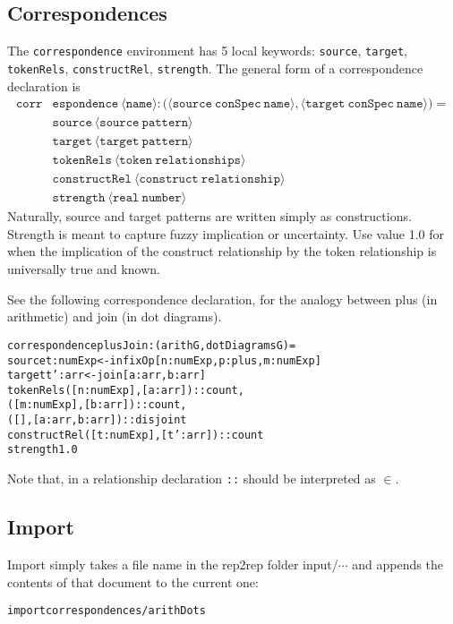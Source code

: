 \documentclass[a4paper]{article}
\theoremstyle{definition}
\begin{document}
	\subsection{Correspondences}
	The \texttt{correspondence} environment has 5 local keywords: \texttt{source}, \texttt{target}, \texttt{tokenRels}, \texttt{constructRel}, \texttt{strength}. The general form of a correspondence declaration is \begin{align*}
	\mathtt{corr}& \mathtt{espondence}\ \mathtt{\langle name\rangle : \big(\langle source\ conSpec\ name\rangle,\langle target\ conSpec\ name\rangle\big)} =\\[-3pt]
	& \mathtt{source\ \langle source\ pattern \rangle}\\[-3pt]
	& \mathtt{target\  \langle target\ pattern \rangle}\\[-3pt]
	& \mathtt{tokenRels\  \langle token\ relationships \rangle}\\[-3pt]
	& \mathtt{constructRel\  \langle construct\ relationship \rangle}\\[-3pt]
	& \mathtt{strength\  \langle real\ number \rangle}
	\end{align*}
	Naturally, source and target patterns are written simply as constructions. Strength is meant to capture fuzzy implication or uncertainty. Use value 1.0 for when the implication of the construct relationship by the token relationship is universally true and known.
	
	See the following correspondence declaration, for the analogy between plus (in arithmetic) and join (in dot diagrams).
\begin{alltt}
correspondence plusJoin:(arithG,dotDiagramsG) =
    source t:numExp <- infixOp[n:numExp,p:plus,m:numExp]
    target t':arr <- join[a:arr,b:arr]
    tokenRels ([n:numExp],[a:arr]) :: count,
              ([m:numExp],[b:arr]) :: count,
              ([],[a:arr,b:arr]) :: disjoint
    constructRel ([t:numExp],[t':arr]) :: count
    strength 1.0
\end{alltt}
 Note that, in a relationship declaration \texttt{::} should be interpreted as $\in$. 
	\subsection{Import}
	Import simply takes a file name in the rep2rep folder input/$\cdots$ and appends the contents of that document to the current one:
\begin{alltt}
import correspondences/arithDots
\end{alltt}
\end{document}
